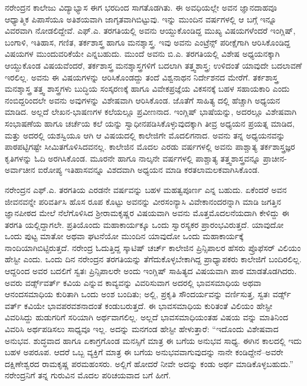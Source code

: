ನರೇಂದ್ರನ ಕಾಲೇಜು ವಿದ್ಯಾಭ್ಯಾಸ ಈಗ ಭರದಿಂದ ಸಾಗತೊಡಗಿತು. ಈ ಅವಧಿಯಲ್ಲೇ ಅವನ ಜ್ಞಾನದಾಹವೂ ಆಧ್ಯಾತ್ಮಿಕ ಪಿಪಾಸೆಯೂ ಅತಿಶಯವಾಗಿ ಜಾಗೃತವಾಗಿಬಿಟ್ಟುವು. ಇನ್ನು ಮುಂದಿನ ವರ್ಷಗಳಲ್ಲಿ ಆ ಬಗ್ಗೆ ಇನ್ನೂ ವಿವರವಾಗಿ ನೋಡಲಿದ್ದೇವೆ. ಎಫ್.ಎ. ತರಗತಿಯಲ್ಲಿ ಅವನು ಆಯ್ದುಕೊಂಡಿದ್ದ ಮುಖ್ಯ ವಿಷಯಗಳೆಂದರೆ ಇಂಗ್ಲಿಷ್, ಬಂಗಾಳಿ, ಇತಿಹಾಸ, ಗಣಿತ, ತರ್ಕಶಾಸ್ತ್ರ ಹಾಗೂ ಮನಶ್ಶಾಸ್ತ್ರ. ಇವು ಅವನು ಎಂಟ್ರೆನ್ಸ್ ಪರೀಕ್ಷೆಗಾಗಿ ಆರಿಸಿಕೊಂಡಿದ್ದ ವಿಷಯಗಳ ಮುಂದುವರಿಕೆಯೇ ಎನ್ನಬಹುದು. ಮುಂದೆ ಅವನು ಬಿ.ಎ. ತರಗತಿಯಲ್ಲಿ ವಿಶೇಷ ಅಧ್ಯಯನಕ್ಕಾಗಿ ಆಯ್ದುಕೊಂಡ ವಿಷಯವೆಂದರೆ, ತರ್ಕಶಾಸ್ತ್ರ ಮನಶ್ಶಾಸ್ತ್ರಗಳಿಗೆ ಬದಲಾಗಿ ತತ್ತ್ವಶಾಸ್ತ್ರ; ಉಳಿದಂತೆ ಯಾವುದೇ ಬದಲಾವಣೆ ಇರಲಿಲ್ಲ. ಅವನು ಈ ವಿಷಯಗಳನ್ನು ಆರಿಸಿಕೊಂಡದ್ದು ತಂದೆ ವಿಶ್ವನಾಥನ ನಿರ್ದೇಶನದ ಮೇರೆಗೆ. ತರ್ಕಶಾಸ್ತ್ರ ಮನಶ್ಶಾಸ್ತ್ರ ತತ್ತ್ವ ಶಾಸ್ತ್ರಗಳು ಬುದ್ಧಿಯ ಸಂಸ್ಕರಣಕ್ಕೆ ಹಾಗೂ ವಿವೇಕಪ್ರಜ್ಞೆಯ ವಿಕಸನಕ್ಕೆ ಬಹಳ ಸಹಾಯಕಾರಿ ಎಂದು ನಂಬಿದ್ದರಿಂದಲೇ ಅವನು ಅವುಗಳನ್ನು ವಿಶೇಷವಾಗಿ ಆರಿಸಿಕೊಂಡ. ಜೊತೆಗೆ ಸಾಹಿತ್ಯ ದಲ್ಲಿ ಹೆಚ್ಚಾಗಿ ಅಧ್ಯಯನ ಮಾಡಿದ. ಅಲ್ಲದೆ ಲೇಖನ-ಭಾಷಣಗಳ ಕಲೆಯಲ್ಲೂ ಪ್ರವೀಣನಾದ. ಇಂಗ್ಲಿಷ್ ಭಾಷೆಯನ್ನು, ಅದರಲ್ಲೂ ವಿಶೇಷವಾಗಿ ಸಂಭಾಷಣೆಯ ಹಾಗೂ ಚರ್ಚೆಯ ಕಲೆ ಯನ್ನು ಸ್ವಾಧೀನಪಡಿಸಿಕೊಳ್ಳುವುದಕ್ಕಾಗಿ ತೀವ್ರ ಅಧ್ಯಯನ ಪ್ರಯತ್ನ ಮಾಡಿದ, ಮತ್ತು ಅದರಲ್ಲಿ ಯಶಸ್ವಿಯೂ ಆಗಿ ಆ ವಿಷಯದಲ್ಲಿ ಕಾಲೇಜಿಗೇ ಮೊದಲಿಗನಾದ. ಅವನು ತನ್ನ ಅಧ್ಯಯನವನ್ನು ಪಾಠಪಟ್ಟಿಗಷ್ಟೇ ಸೀಮಿತಗೊಳಿಸಿದವನಲ್ಲ. ಕಾಲೇಜಿನ ಮೊದಲ ಎರಡು ವರ್ಷಗಳಲ್ಲಿ ಅವನು ಪಾಶ್ಚಾತ್ಯ ತರ್ಕಶಾಸ್ತ್ರಜ್ಞರ ಕೃತಿಗಳನ್ನು ಓದಿ ಅರಗಿಸಿಕೊಂಡ. ಮೂರನೇ ಹಾಗೂ ನಾಲ್ಕನೇ ವರ್ಷಗಳಲ್ಲಿ ಪಾಶ್ಚಾತ್ಯ ತತ್ತ್ವಶಾಸ್ತ್ರವನ್ನೂ ಪ್ರಾಚೀನ-ಅರ್ವಾಚೀನ ಐರೋಪ್ಯ ಇತಿಹಾಸವನ್ನೂ ವಿಶದವಾಗಿ ಅಧ್ಯಯನ ಮಾಡಿ ಕರತಲಾಮಲಕವಾಗಿಸಿಕೊಂಡ.

ನರೇಂದ್ರನ ಎಫ್.ಎ. ತರಗತಿಯ ಎರಡನೇ ವರ್ಷವನ್ನು ಬಹಳ ಮಹತ್ವಪೂರ್ಣ ಎನ್ನ ಬಹುದು. ಏಕೆಂದರೆ ಅವನ ಜೀವನವನ್ನೇ ಪರಿವರ್ತಿಸಿ ಹೊಸ ರೂಪ ಕೊಟ್ಟು ಅವನನ್ನು ವೀರಸಂನ್ಯಾಸಿ ವಿವೇಕಾನಂದರನ್ನಾಗಿ ಮಾಡಿ ಜಗತ್ತಿನ ಜ್ಞಾನಪೀಠದ ಮೇಲೆ ನೆಲೆಗೊಳಿಸಿದ ಶ್ರೀರಾಮಕೃಷ್ಣರ ವಿಷಯವಾಗಿ ಅವನು ಮೊತ್ತಮೊದಲನೆಯದಾಗಿ ಕೇಳಿದ್ದು ಈ ತರಗತಿ ಯಲ್ಲಿದ್ದಾಗಲೇ. ಪ್ರತಿಯೊಂದು ಮಹಾಕಾರ್ಯಕ್ಕೂ ಒಂದು ಸ್ವಾರಸ್ಯಕರ ಪ್ರಾರಂಭವಿರುತ್ತದೆ. ಯಾವುದೋ ಒಂದು ಪುಟ್ಟ ಮಾತೋ ಅಥವಾ ಘಟನೆಯೋ ಮುಂದಿನ ಯಾವುದೋ ಒಂದು ಮಹಾಕಾರ್ಯಕ್ಕೆ ನಾಂದಿಯಾಗಿಬಿಟ್ಟಿರುತ್ತದೆ. ನರೇಂದ್ರ ಓದುತ್ತಿದ್ದ ಸ್ಕಾಟಿಷ್ ಚರ್ಚ್ ಕಾಲೇಜಿನ ಪ್ರಿನ್ಸಿಪಾಲರ ಹೆಸರು ಪ್ರೊಫೆಸರ್ ವಿಲಿಯಂ ಹೇಸ್ಟೀ ಎಂದು. ಒಂದು ದಿನ ನರೇಂದ್ರನ ತರಗತಿಯನ್ನು ತೆಗೆದುಕೊಳ್ಳಬೇಕಾಗಿದ್ದ ಪ್ರಾಧ್ಯಾಪಕರು ಕಾಲೇಜಿಗೆ ಬಂದಿರಲಿಲ್ಲ. ಆದ್ದರಿಂದ ಅವರ ಬದಲಿಗೆ ಸ್ವತಃ ಪ್ರಿನ್ಸಿಪಾಲರೇ ಅಂದು ಇಂಗ್ಲಿಷ್ ಸಾಹಿತ್ಯದ ವಿಷಯವಾಗಿ ಪಾಠ ಮಾಡತೊಡಗಿದರು. ಅವರು ವರ್ಡ್ಸ್​ವರ್ತ್ ಕವಿಯ  ಎನ್ನುವ ಕಾವ್ಯವನ್ನು ವಿವರಿಸುವಾಗ ಅದರಲ್ಲಿ ಭಾವಸಮಾಧಿಯ ಅಥವಾ ಆನಂದಸಮಾಧಿಯ ಕುರಿತಾಗಿ ಒಂದು ಅಂಶ ಬಂದಿತು; ಅಲ್ಲಿ, ಪ್ರಕೃತಿ ಸೌಂದರ್ಯವನ್ನು ವರ್ಣಿಸುತ್ತ, ಸ್ವತಃ ವರ್ಡ್ಸ್​ವರ್ತ್ ಕವಿಯೇ ಭಾವಪರವಶನಾದಂತೆ ಕಂಡುಬರುತ್ತದೆ. ಈ ಭಾವಸಮಾಧಿಯ ಕುರಿತಂತೆ ವಿಲಿಯಂ ಹೇಸ್ಟೀ ವಿವರಿಸಿದ್ದು ಹುಡುಗರಿಗೆ ಸರಿಯಾಗಿ ಅರ್ಥವಾಗಲಿಲ್ಲ. ಅಲ್ಲದೆ ಭಾವಸಮಾಧಿಯಂತಹ ವಿಷಯ ವನ್ನು ಮಾತಿನಿಂದ ವಿವರಿಸಿ ಅರ್ಥಪಡಿಸಲು ಸಾಧ್ಯವೂ ಇಲ್ಲ. ಅದನ್ನು ಮನಗಂಡ ಹೇಸ್ಟೀ ಹೇಳುತ್ತಾರೆ: “ಇದೊಂದು ವಿಶೇಷವಾದ ಅನುಭವ. ಶುದ್ಧವಾದ ಹಾಗೂ ಏಕಾಗ್ರಗೊಂಡ ಮನಸ್ಸಿಗೆ ಮಾತ್ರ ಈ ಬಗೆಯ ಅನುಭವ ಸಾಧ್ಯ. ಈಗಿನ ಕಾಲದಲ್ಲಿ ಇದು ಬಹಳ ಅಪರೂಪ. ಆದರೆ ಒಬ್ಬ ವ್ಯಕ್ತಿಗೆ ಮಾತ್ರ ಈ ಬಗೆಯ ಅನುಭವವಾಗುವುದನ್ನು ನಾನೇ ಕಂಡಿದ್ದೇನೆ–ಅವರೇ ದಕ್ಷಿಣೇಶ್ವರದ ರಾಮಕೃಷ್ಣ ಪರಮಹಂಸರು. ಅಲ್ಲಿಗೆ ಹೋದರೆ ನೀವೇ ಅದನ್ನು ಕಂಡು ಅರ್ಥ ಮಾಡಿಕೊಳ್ಳಬಹುದು.” ನರೇಂದ್ರನಿಗೆ ತನ್ನ ಗುರುವಿನ ಮೊದಲ ಪರಿಚಯವಾದ ಬಗೆ ಹೀಗೆ.

